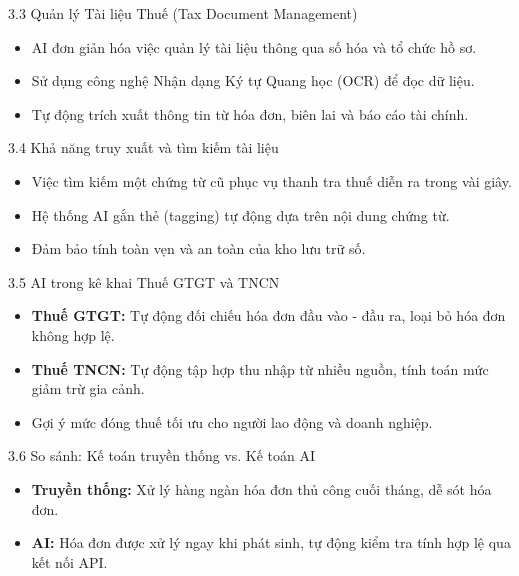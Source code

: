 \documentclass[aspectratio=169]{beamer}
\begin{document}
\begin{frame}{3.3 Quản lý Tài liệu Thuế (Tax Document Management)}
    \begin{itemize}
        \item AI đơn giản hóa việc quản lý tài liệu thông qua số hóa và tổ chức hồ sơ.
        \item Sử dụng công nghệ Nhận dạng Ký tự Quang học (OCR) để đọc dữ liệu.
        \item Tự động trích xuất thông tin từ hóa đơn, biên lai và báo cáo tài chính.
    \end{itemize}
\end{frame}


\begin{frame}{3.4 Khả năng truy xuất và tìm kiếm tài liệu}
    \begin{itemize}
        \item Việc tìm kiếm một chứng từ cũ phục vụ thanh tra thuế diễn ra trong vài giây.
        \item Hệ thống AI gắn thẻ (tagging) tự động dựa trên nội dung chứng từ.
        \item Đảm bảo tính toàn vẹn và an toàn của kho lưu trữ số.
    \end{itemize}
\end{frame}


\begin{frame}{3.5 AI trong kê khai Thuế GTGT và TNCN}
    \begin{itemize}
        \item \textbf{Thuế GTGT:} Tự động đối chiếu hóa đơn đầu vào - đầu ra, loại bỏ hóa đơn không hợp lệ.
        \item \textbf{Thuế TNCN:} Tự động tập hợp thu nhập từ nhiều nguồn, tính toán mức giảm trừ gia cảnh.
        \item Gợi ý mức đóng thuế tối ưu cho người lao động và doanh nghiệp.
    \end{itemize}
\end{frame}


\begin{frame}{3.6 So sánh: Kế toán truyền thống vs. Kế toán AI}
    \begin{itemize}
        \item \textbf{Truyền thống:} Xử lý hàng ngàn hóa đơn thủ công cuối tháng, dễ sót hóa đơn.
        \item \textbf{AI:} Hóa đơn được xử lý ngay khi phát sinh, tự động kiểm tra tính hợp lệ qua kết nối API.
    \end{itemize}
\end{frame}
\end{document}
